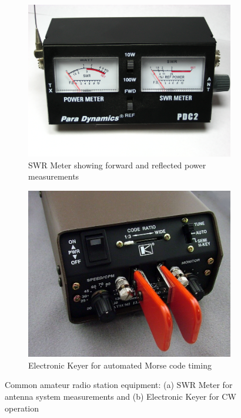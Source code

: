\begin{figure}[h!]
    \centering
    \begin{subfigure}[b]{0.45\textwidth}
        \centering
        \includegraphics[width=\textwidth]{tech/images/swr_meter.jpg}
        \caption{SWR Meter showing forward and reflected power measurements}
        \label{fig:swr-meter}
    \end{subfigure}
    \hfill
    \begin{subfigure}[b]{0.45\textwidth}
        \centering
        \includegraphics[width=\textwidth]{tech/images/keyer.jpg}
        \caption{Electronic Keyer for automated Morse code timing}
        \label{fig:electronic-keyer}
    \end{subfigure}
    \caption{Common amateur radio station equipment: (a) SWR Meter for antenna system measurements and (b) Electronic Keyer for CW operation}
    \label{fig:station-equipment}
\end{figure}

